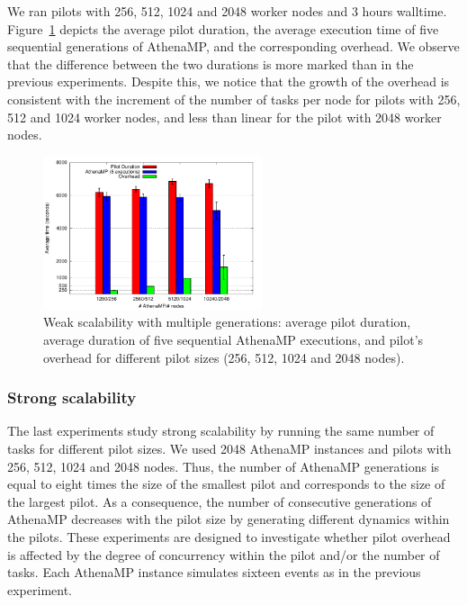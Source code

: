 
We ran pilots with 256, 512, 1024 and 2048 worker nodes and 3 hours
walltime. Figure~\ref{fig:weakScal2a} depicts the average pilot duration, the
average execution time of five sequential generations of AthenaMP, and the
corresponding overhead. We observe that the difference between the two durations
is more marked than in the previous experiments. Despite this, we notice that
the growth of the overhead is consistent with the increment of the number of
tasks per node for pilots with 256, 512 and 1024 worker nodes, and less than
linear for the pilot with 2048 worker nodes.

\begin{figure}[!htb]
        \includegraphics[height=4.5cm,width=\columnwidth]{./figures/NGE/weak2.pdf}
    \caption{Weak scalability with multiple generations: average pilot
    duration, average duration of five sequential AthenaMP executions, and
    pilot's overhead for different pilot sizes (256, 512, 1024 and 2048 nodes).}
\label{fig:weakScal2a}
\end{figure}



\subsubsection{Strong scalability}

The last experiments  study strong scalability by running the same number of
tasks for different pilot sizes. We used 2048 AthenaMP instances and  pilots
with 256, 512, 1024 and 2048 nodes. Thus, the number of AthenaMP generations is
equal to eight times the size of the smallest pilot and corresponds to the size
of the largest pilot. As a consequence, the number of consecutive generations of
AthenaMP decreases with the pilot size by generating different dynamics within
the pilots. These experiments are designed to investigate whether pilot overhead
is affected by the degree of concurrency within the pilot and/or the number of
tasks. Each AthenaMP instance simulates sixteen events as in the previous
experiment.

